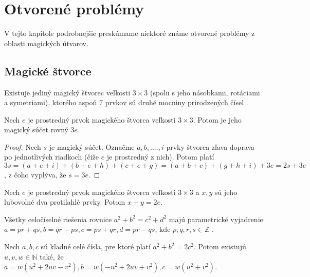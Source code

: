 \chapter{Otvorené problémy}

\label{kap:definitions} %

\label{kap: openproblems} %

V tejto kapitole podrobnejšie preskúmame niektoré známe otvorené problémy z oblasti magických útvarov.

\section{Magické štvorce}

\begin{hypothesis} Existuje jediný magický štvorec veľkosti $3 \times 3$ (spolu s jeho násobkami, rotáciami a symetriami), ktorého aspoň $7$ prvkov sú druhé mocniny prirodzených čísel \cite{multimagie}.
\end{hypothesis}

\begin{theorem} Nech $e$ je prostredný prvok magického štvorca veľkosti $3 \times 3$. Potom je jeho magický súčet rovný $3e$.
\end{theorem}

\begin{proof} Nech $s$ je magický súčet. Označme $a, b, .... , i$ prvky štvorca zľava doprava po jednotlivých riadkoch (čiže $e$ je prostredný z nich). Potom platí $3s = (a + e + i) + (b + e + h) + (c + e + g) = (a + b + c) + (g + h + i) + 3e = 2s + 3e$, z čoho vyplýva, že $s = 3e$.
\end{proof}

\begin{consequence} Nech $e$ je prostredný prvok magického štvorca veľkosti $3 \times 3$ a $x,y$ sú jeho ľubovoľné dva protiľahlé prvky. Potom $x + y = 2e$.
\end{consequence}

\begin{lemma} Všetky celočíselné riešenia rovnice $a^2 + b^2 = c^2 + d^2$ majú parametrické vyjadrenie $a = pr + qs, b = qr - ps, c = ps + qr, d = pr - qs$, kde $p,q,r,s \in \mathbb{Z}$ \cite{algebraic}.
\end{lemma}

\begin{lemma}  Nech $a,b,c$ sú kladné celé čísla, pre ktoré platí $a^2 + b^2 = 2c^2$. Potom existujú $u,v,w \in \mathbb{N}$ také, že $a = w(u^2 + 2uv - v^2), b = w(- u^2 + 2uv + v^2), c = w(u^2 + v^2)$.
\end{lemma}

